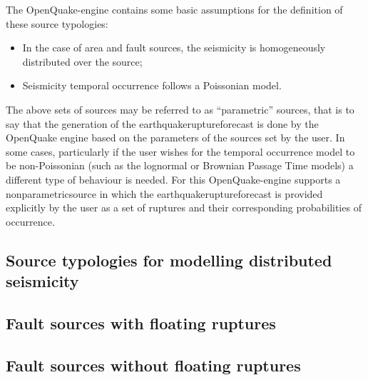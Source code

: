 The OpenQuake-engine contains some basic assumptions for the definition of
these source typologies:

\begin{itemize}

    \item In the case of area and fault sources, the seismicity is
    homogeneously distributed over the source;

    \item Seismicity temporal occurrence follows a Poissonian model.

\end{itemize}

The above sets of sources may be referred to as ``parametric'' sources, that is to say that the generation of the \Gls{earthquakeruptureforecast} is done by the OpenQuake engine based on the parameters of the sources set by the user. In some cases, particularly if the user wishes for the temporal occurrence model to be non-Poissonian (such as the lognormal or Brownian Passage Time models) a different type of behaviour is needed. For this OpenQuake-engine supports a \Gls{nonparametricsource} in which the \Gls{earthquakeruptureforecast} is provided explicitly by the user as a set of ruptures and their corresponding probabilities of occurrence.

\subsection{Source typologies for modelling distributed seismicity}


\subsection{Fault sources with floating ruptures}


\subsection{Fault sources without floating ruptures}

